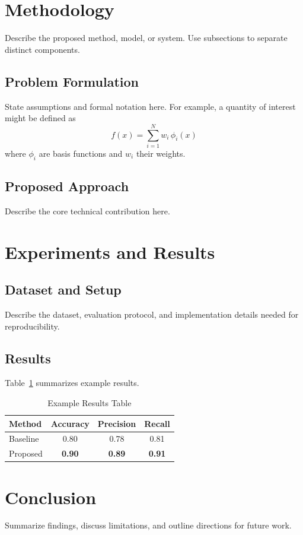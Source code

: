 \documentclass[journal,twoside,web]{ieeecolor}
\begin{document}
\section{Methodology}
\label{sec:methodology}
Describe the proposed method, model, or system. Use subsections to separate
distinct components.

\subsection{Problem Formulation}
State assumptions and formal notation here. For example, a quantity of
interest might be defined as
\[
f(x) = \sum_{i=1}^{N} w_i \, \phi_i(x)
\]
where $\phi_i$ are basis functions and $w_i$ their weights.

\subsection{Proposed Approach}
Describe the core technical contribution here.

\section{Experiments and Results}
\label{sec:experiments}

\subsection{Dataset and Setup}
Describe the dataset, evaluation protocol, and implementation details needed
for reproducibility.

\subsection{Results}
Table~\ref{tab:results} summarizes example results.

\begin{table}[!t]
\caption{Example Results Table}
\label{tab:results}
\centering
\begin{tabular}{lccc}
\toprule
\textbf{Method} & \textbf{Accuracy} & \textbf{Precision} & \textbf{Recall} \\
\midrule
Baseline & 0.80 & 0.78 & 0.81 \\
Proposed & \textbf{0.90} & \textbf{0.89} & \textbf{0.91} \\
\bottomrule
\end{tabular}
\end{table}

\section{Conclusion}
\label{sec:conclusion}
Summarize findings, discuss limitations, and outline directions for future
work.



\end{document}
